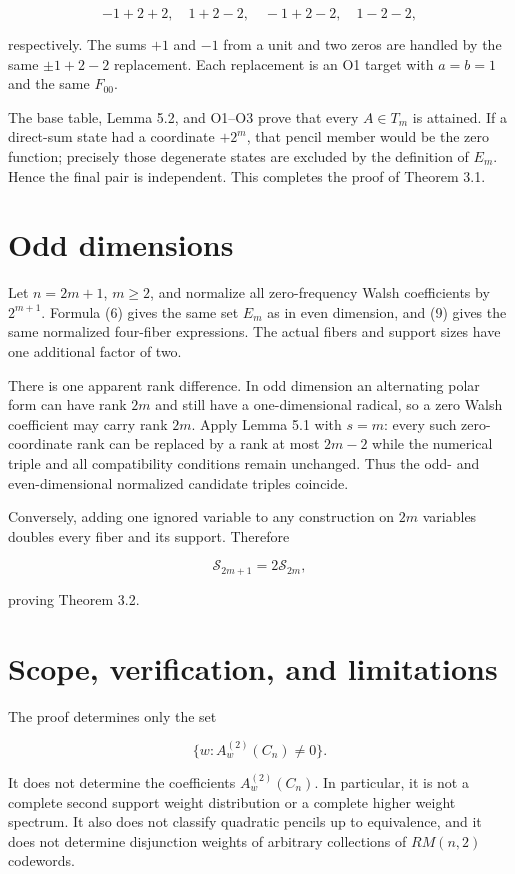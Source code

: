 \documentclass[11pt]{article}
\theoremstyle{remark}
\begin{document}
\[
-1+2+2,\quad
1+2-2,\quad
-1+2-2,\quad
1-2-2,
\tag{33}
\]

respectively. The sums $+1$ and $-1$ from a unit and two zeros are handled by the same $\pm 1+2-2$ replacement. Each replacement is an O1 target with $a=b=1$ and the same $F_{00}$.

The base table, Lemma 5.2, and O1--O3 prove that every $A \in T_m$ is attained. If a direct-sum state had a coordinate $+2^m$, that pencil member would be the zero function; precisely those degenerate states are excluded by the definition of $E_m$. Hence the final pair is independent. This completes the proof of Theorem 3.1.

\section{Odd dimensions}

Let $n=2m+1$, $m\ge 2$, and normalize all zero-frequency Walsh coefficients by $2^{m+1}$. Formula (6) gives the same set $E_m$ as in even dimension, and (9) gives the same normalized four-fiber expressions. The actual fibers and support sizes have one additional factor of two.

There is one apparent rank difference. In odd dimension an alternating polar form can have rank $2m$ and still have a one-dimensional radical, so a zero Walsh coefficient may carry rank $2m$. Apply Lemma 5.1 with $s=m$: every such zero-coordinate rank can be replaced by a rank at most $2m-2$ while the numerical triple and all compatibility conditions remain unchanged. Thus the odd- and even-dimensional normalized candidate triples coincide.

Conversely, adding one ignored variable to any construction on $2m$ variables doubles every fiber and its support. Therefore

\[
\mathcal S_{2m+1}=2\mathcal S_{2m},
\]

proving Theorem 3.2.

\section{Scope, verification, and limitations}

The proof determines only the set

\[
\{w:A_w^{(2)}(C_n)\ne0\}.
\]

It does not determine the coefficients $A_w^{(2)}(C_n)$. In particular, it is not a complete second support weight distribution or a complete higher weight spectrum. It also does not classify quadratic pencils up to equivalence, and it does not determine disjunction weights of arbitrary collections of $RM(n,2)$ codewords.
\end{document}
